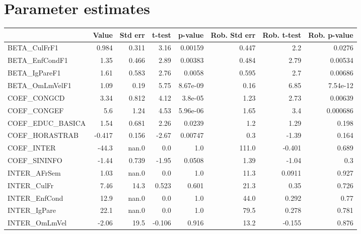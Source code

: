 \section{Parameter estimates}
\begin{tabular}{lrrrrrrr}
\toprule
{} &  Value &  Std err &  t-test &  p-value &  Rob. Std err &  Rob. t-test &  Rob. p-value \\
\midrule
BETA\_CulFrF1       &  0.984 &    0.311 &    3.16 &  0.00159 &         0.447 &          2.2 &        0.0276 \\
BETA\_EnfCondF1     &   1.35 &    0.466 &    2.89 &  0.00383 &         0.484 &         2.79 &       0.00534 \\
BETA\_IgPareF1      &   1.61 &    0.583 &    2.76 &   0.0058 &         0.595 &          2.7 &       0.00686 \\
BETA\_OmLmVelF1     &   1.09 &     0.19 &    5.75 & 8.67e-09 &          0.16 &         6.85 &      7.54e-12 \\
COEF\_CONGCD        &   3.34 &    0.812 &    4.12 &  3.8e-05 &          1.23 &         2.73 &       0.00639 \\
COEF\_CONGEF        &    5.6 &     1.24 &    4.53 & 5.96e-06 &          1.65 &          3.4 &      0.000686 \\
COEF\_EDUC\_BASICA   &   1.54 &    0.681 &    2.26 &   0.0239 &           1.2 &         1.29 &         0.198 \\
COEF\_HORASTRAB     & -0.417 &    0.156 &   -2.67 &  0.00747 &           0.3 &        -1.39 &         0.164 \\
COEF\_INTER         &  -44.3 &    nan.0 &     0.0 &      1.0 &         111.0 &       -0.401 &         0.689 \\
COEF\_SININFO       &  -1.44 &    0.739 &   -1.95 &   0.0508 &          1.39 &        -1.04 &           0.3 \\
INTER\_AFrSem       &   1.03 &    nan.0 &     0.0 &      1.0 &          11.3 &       0.0911 &         0.927 \\
INTER\_CulFr        &   7.46 &     14.3 &   0.523 &    0.601 &          21.3 &         0.35 &         0.726 \\
INTER\_EnfCond      &   12.9 &    nan.0 &     0.0 &      1.0 &          44.0 &        0.292 &          0.77 \\
INTER\_IgPare       &   22.1 &    nan.0 &     0.0 &      1.0 &          79.5 &        0.278 &         0.781 \\
INTER\_OmLmVel      &  -2.06 &     19.5 &  -0.106 &    0.916 &          13.2 &       -0.155 &         0.876 \\

\end{tabular}
